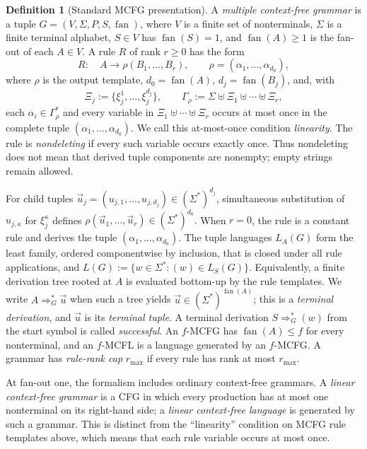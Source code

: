 \documentclass[11pt]{article}
\numberwithin{equation}{section}
\theoremstyle{plain}
\theoremstyle{definition}
\newtheorem{definition}[theorem]{Definition}
\theoremstyle{remark}
\newcommand{\tuple}[1]{\vec{#1}}
\newcommand{\fan}{\operatorname{fan}}
\begin{document}
\begin{definition}[Standard MCFG presentation]
\label{def:standard-mcfg}
A \emph{multiple context-free grammar} is a tuple
\(G=(V,\Sigma,P,S,\fan)\), where \(V\) is a finite set of nonterminals,
\(\Sigma\) is a finite terminal alphabet, \(S\in V\) has \(\fan(S)=1\), and
\(\fan(A)\ge1\) is the fan-out of each \(A\in V\).  A rule \(R\) of rank \(r\ge0\) has the form
\[
  R:\quad A\to\rho(B_1,\ldots,B_r),
  \qquad
  \rho=(\alpha_1,\ldots,\alpha_{d_0}),
\]
where \(\rho\) is the output template, \(d_0=\fan(A)\), \(d_j=\fan(B_j)\), and, with
\[
  \Xi_j:=\{\xi_j^1,\ldots,\xi_j^{d_j}\},
  \qquad
  \Gamma_\rho:=\Sigma\uplus\Xi_1\uplus\cdots\uplus\Xi_r,
\]
each \(\alpha_i\in\Gamma_\rho^*\) and every variable in
\(\Xi_1\uplus\cdots\uplus\Xi_r\) occurs at most once in the complete tuple
\((\alpha_1,\ldots,\alpha_{d_0})\).  We call this at-most-once condition
\emph{linearity}.  The rule is \emph{nondeleting} if every such variable occurs
exactly once.  Thus nondeleting does not mean that derived tuple components are
nonempty; empty strings remain allowed.

For child tuples
\(\tuple u_j=(u_{j,1},\ldots,u_{j,d_j})\in(\Sigma^*)^{d_j}\), simultaneous substitution of
\(u_{j,\kappa}\) for \(\xi_j^{\kappa}\) defines
\(\rho(\tuple u_1,\ldots,\tuple u_r)\in(\Sigma^*)^{d_0}.\)
When \(r=0\), the rule is a constant rule and derives the tuple
\((\alpha_1,\ldots,\alpha_{d_0})\).  The tuple languages \(L_A(G)\) form the least family, ordered componentwise by
inclusion, that is closed under all rule applications, and
\(L(G):=\{w\in\Sigma^*:(w)\in L_S(G)\}.\)
Equivalently, a finite derivation tree rooted at $A$ is evaluated bottom-up by
the rule templates.  We write $A\Rightarrow_G^*\tuple u$ when such a tree
yields $\tuple u\in(\Sigma^*)^{\fan(A)}$; this is a \emph{terminal
derivation}, and $\tuple u$ is its \emph{terminal tuple}.  A terminal
derivation $S\Rightarrow_G^*(w)$ from the start symbol is called
\emph{successful}.
An \(f\)-MCFG has \(\fan(A)\le f\) for every nonterminal, and an \(f\)-MCFL is
a language generated by an \(f\)-MCFG.  A grammar has \emph{rule-rank cap} \(r_{\max}\) if every rule has rank at most \(r_{\max}\).
\end{definition}

At fan-out one, the formalism includes ordinary context-free grammars.  A
\emph{linear context-free grammar} is a CFG in which every production has at
most one nonterminal on its right-hand side; a \emph{linear context-free
language} is generated by such a grammar.  This is distinct from the
``linearity'' condition on MCFG rule templates above, which means that each
rule variable occurs at most once.
\end{document}

